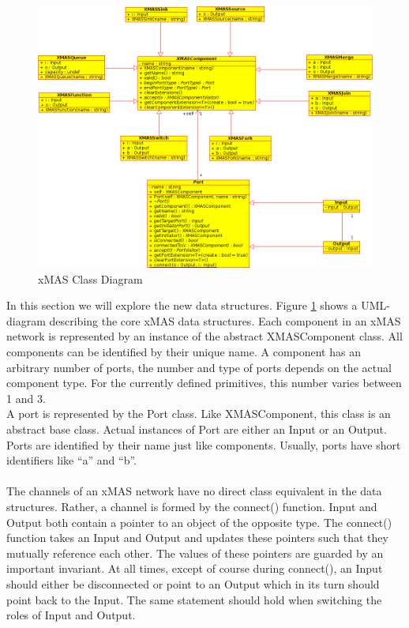 \documentclass[a4paper,11pt]{article}
\begin{document}
\begin{figure}[h]
 \includegraphics[width=\textwidth]{images/xmas-components}
 \caption{xMAS Class Diagram}
 \label{fig:xmas-components}
\end{figure}

In this section we will explore the new data structures. Figure \ref{fig:xmas-components} shows a
UML-diagram describing the core xMAS data structures. Each component in an xMAS network is represented
by an instance of the abstract XMASComponent class. All components can be identified by their unique name.
A component has an arbitrary number of ports, the number and type of ports depends on the actual
component type. For the currently defined primitives, this number varies between 1 and 3.\\
A port is represented by the Port class. Like XMASComponent, this class is an abstract base class. Actual instances
of Port are either an Input or an Output. Ports are identified by their name just like components.
Usually, ports have short identifiers like ``a'' and ``b''. 
\paragraph{}
The channels of an xMAS network have no direct class equivalent in the data structures. Rather, a channel is
formed by the connect() function. Input and Output both contain a pointer to an object of the opposite type.
The connect() function takes an Input and Output and updates these pointers such that they mutually
reference each other. The values of these pointers are guarded by an important invariant. At all times, 
except of course during connect(), an Input should either be disconnected or point to an Output which
in its turn should point back to the Input. The same statement should hold when switching the roles of
Input and Output.
\end{document}
